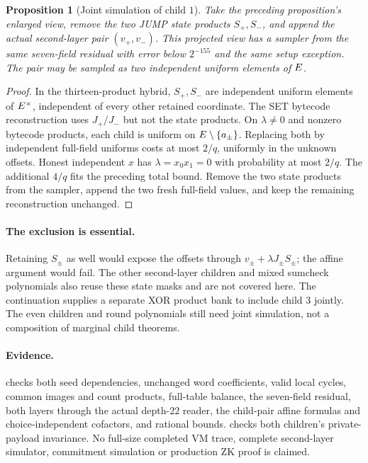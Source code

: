 \documentclass[11pt]{article}
\newtheorem{proposition}{Proposition}
\begin{document}
\begin{proposition}[Joint simulation of child $1$]
Take the preceding proposition's enlarged view, remove the two JUMP state products $S_+,S_-$, and append the actual second-layer pair $(v_+,v_-)$. This projected view has a sampler from the same seven-field residual with error below $2^{-155}$ and the same setup exception. The pair may be sampled as two independent uniform elements of $E$.
\end{proposition}
\begin{proof}
In the thirteen-product hybrid, $S_+,S_-$ are independent uniform elements of $E^\times$, independent of every other retained coordinate. The SET bytecode reconstruction uses $J_+/J_-$ but not the state products. On $\lambda\ne0$ and nonzero bytecode products, each child is uniform on $E\setminus\{a_\pm\}$. Replacing both by independent full-field uniforms costs at most $2/q$, uniformly in the unknown offsets. Honest independent $x$ has $\lambda=x_0x_1=0$ with probability at most $2/q$. The additional $4/q$ fits the preceding total bound. Remove the two state products from the sampler, append the two fresh full-field values, and keep the remaining reconstruction unchanged.
\end{proof}

\paragraph{The exclusion is essential.} Retaining $S_\pm$ as well would expose the offsets through $v_\pm+\lambda J_\pm S_\pm$; the affine argument would fail. The other second-layer children and mixed sumcheck polynomials also reuse these state masks and are not covered here. The continuation  supplies a separate XOR product bank to include child $3$ jointly. The even children and round polynomials still need joint simulation, not a composition of marginal child theorems.

\paragraph{Evidence.}  checks both seed dependencies, unchanged word coefficients, valid local cycles, common images and count products, full-table balance, the seven-field residual, both layers through the actual depth-$22$ reader, the child-pair affine formulas and choice-independent cofactors, and rational bounds.  checks both children's private-payload invariance. No full-size completed VM trace, complete second-layer simulator, commitment simulation or production ZK proof is claimed.
\end{document}
